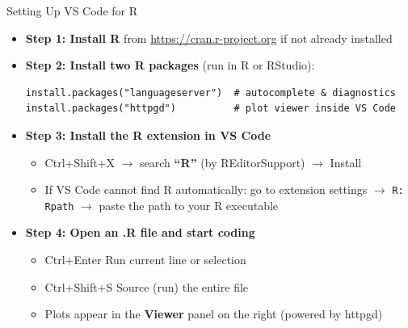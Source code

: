 \documentclass[hyperref={pdfpagelabels=false}]{beamer}
\begin{document}

\begin{frame}[fragile]{Setting Up VS Code for R}

\begin{itemize}
	\item \textbf{Step 1: Install R} from \url{https://cran.r-project.org} if not already installed
	\vspace{0.2cm}
	\item \textbf{Step 2: Install two R packages} (run in R or RStudio):
\begin{lstlisting}[style=nonumbers, basicstyle=\small\ttfamily, frame=single]
install.packages("languageserver")  # autocomplete & diagnostics
install.packages("httpgd")          # plot viewer inside VS Code
\end{lstlisting}
	\vspace{0.15cm}
	\item \textbf{Step 3: Install the R extension in VS Code}
	\vspace{0.1cm}
	\begin{itemize}
		\item Ctrl+Shift+X $\to$ search \textbf{``R''} (by REditorSupport) $\to$ Install
		\vspace{0.1cm}
		\item If VS Code cannot find R automatically: go to extension settings $\to$ \texttt{R: Rpath} $\to$ paste the path to your R executable
	\end{itemize}
	\vspace{0.2cm}
	\item \textbf{Step 4: Open an .R file and start coding}
	\vspace{0.1cm}
	\begin{itemize}
		\item Ctrl+Enter \hfill Run current line or selection
		\vspace{0.05cm}
		\item Ctrl+Shift+S \hfill Source (run) the entire file
		\vspace{0.05cm}
		\item Plots appear in the \textbf{Viewer} panel on the right (powered by httpgd)
	\end{itemize}
\end{itemize}

\end{frame}
\end{document}
